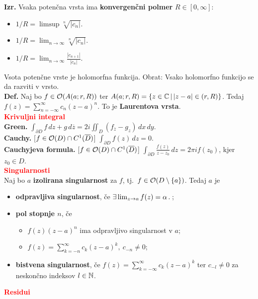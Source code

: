 \documentclass[a4paper,oneside,8pt,landscape]{extarticle}
\begin{document}
\begin{multicols*}{3}
%
\textbf{Izr.} Vsaka potenčna vrsta ima \textbf{konvergenčni polmer} \(R \in [0, \infty]\):
\begin{itemize}
    \item \(1/R = \limsup \sqrt[n]{|c_n|}\).
    \item \(1/R = \lim_{n \to \infty} \sqrt[n]{|c_n|}\).
    \item \(1/R = \lim_{n \to \infty} \frac{|c_{n+1}|}{|c_n|}\).
\end{itemize}
Vsota potenčne vrste je holomorfna funkcija. Obrat: Vsako holomorfno funkcijo se da razviti v vrsto.\\
%
\textbf{Def.} Naj bo \(f \in \mathcal{O}(A(a; r, R))\) ter \(A(a; r, R) = \{z \in \mathbb{C} \,|\, |z-a| \in (r, R)\}\). Tedaj \(f(z) = \sum_{n = -\infty}^{\infty} c_n(z-a)^n\). To je \textbf{Laurentova vrsta}.\\
%
\textbf{\textcolor{red}{Krivuljni integral}}\\
\textbf{Green.} \(\int_{\partial D} f\, dz + g\, d\overline{z} = 2i \iint_D (f_{\overline{z}} - g_z)\, dx\, dy\).\\
%
\textbf{Cauchy.} [\(f \in \mathcal{O}(D) \cap C^1(\overline{D})\)] \(\int_{\partial D} f(z) \, dz = 0\).\\
%
\textbf{Cauchyjeva formula.} [\(f \in \mathcal{O}(D) \cap C^1(\overline{D})\)] \(\int_{\partial D} \frac{f(z)}{z-z_0}\, dz = 2\pi i f(z_0)\), kjer \(z_0 \in D\).\\
\textbf{\textcolor{red}{Singularnosti}}\\
Naj bo \(a\) \textbf{izolirana singularnost} za \(f\), tj.\ \(f \in \mathcal{O}(D \setminus \{a\})\). Tedaj \(a\) je
\begin{itemize}
    \item \textbf{odpravljiva singularnost}, če \(\exists \lim_{z \to a} f(z) = \alpha \,.\,\);
    \item \textbf{pol stopnje \(n\)}, če
    \begin{itemize}
        \item \(f(z)(z-a)^n\) ima odpravljivo singularnost v \(a\);
        \item \(f(z) = \sum_{k=-n}^{\infty} c_k (z-a)^k,\ c_{-n} \neq 0\);
    \end{itemize}
    \item \textbf{bistvena singularnost}, če \(f(z) = \sum_{k = -\infty}^{\infty}c_k(z-a)^k\) ter \(c_{-l} \neq 0\) za neskončno indeksov \(l \in \mathbb{N}\).
\end{itemize}
\textbf{\textcolor{red}{Residui}}\\

\end{multicols*}
\end{document}
